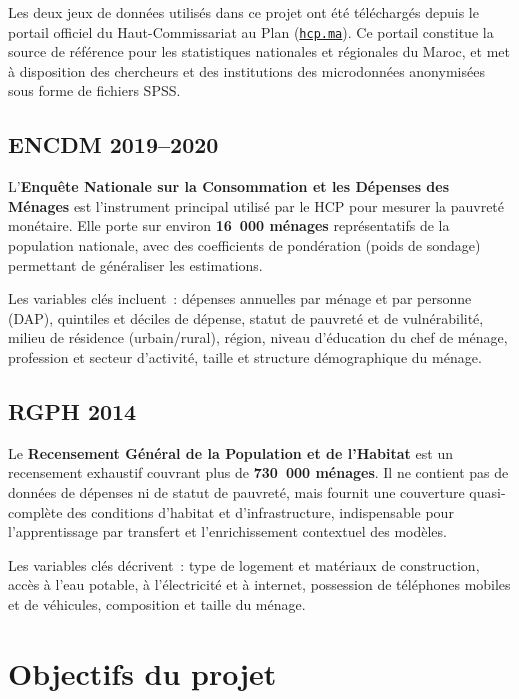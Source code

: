 \documentclass[12pt,a4paper]{report}
\begin{document}
Les deux jeux de données utilisés dans ce projet ont été téléchargés depuis le portail officiel du Haut-Commissariat au Plan (\href{https://www.hcp.ma}{\texttt{hcp.ma}}). Ce portail constitue la source de référence pour les statistiques nationales et régionales du Maroc, et met à disposition des chercheurs et des institutions des microdonnées anonymisées sous forme de fichiers SPSS.

\subsection{ENCDM 2019--2020}

L'\textbf{Enquête Nationale sur la Consommation et les Dépenses des Ménages} est l'instrument principal utilisé par le HCP pour mesurer la pauvreté monétaire. Elle porte sur environ \textbf{16~000 ménages} représentatifs de la population nationale, avec des coefficients de pondération (poids de sondage) permettant de généraliser les estimations.

Les variables clés incluent~: dépenses annuelles par ménage et par personne (DAP), quintiles et déciles de dépense, statut de pauvreté et de vulnérabilité, milieu de résidence (urbain/rural), région, niveau d'éducation du chef de ménage, profession et secteur d'activité, taille et structure démographique du ménage.

\subsection{RGPH 2014}

Le \textbf{Recensement Général de la Population et de l'Habitat} est un recensement exhaustif couvrant plus de \textbf{730~000 ménages}. Il ne contient pas de données de dépenses ni de statut de pauvreté, mais fournit une couverture quasi-complète des conditions d'habitat et d'infrastructure, indispensable pour l'apprentissage par transfert et l'enrichissement contextuel des modèles.

Les variables clés décrivent~: type de logement et matériaux de construction, accès à l'eau potable, à l'électricité et à internet, possession de téléphones mobiles et de véhicules, composition et taille du ménage.

\section{Objectifs du projet}
\end{document}
